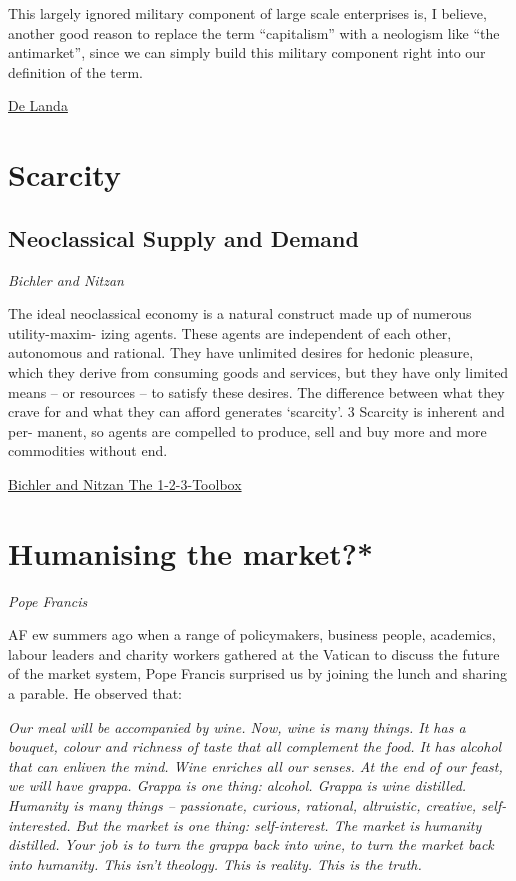 \documentclass[
]{book}
\begin{document}
This largely ignored military component of large scale enterprises is, I believe, another good reason to replace the term ``capitalism'' with a neologism like ``the antimarket'', since we can simply build this military component right into our definition of the term.

\href{https://wiki.p2pfoundation.net/Capitalism_as_an_Anti-Market}{De Landa}

\hypertarget{scarcity}{%
\section{Scarcity}\label{scarcity}}

\hypertarget{neoclassical-supply-and-demand}{%
\subsection{Neoclassical Supply and Demand}\label{neoclassical-supply-and-demand}}

\emph{Bichler and Nitzan}

The ideal neoclassical economy is a natural construct made up of numerous utility-maxim-
izing agents. These agents are independent of each other, autonomous and rational. They have
unlimited desires for hedonic pleasure, which they derive from consuming goods and services,
but they have only limited means -- or resources -- to satisfy these desires. The difference between
what they crave for and what they can afford generates `scarcity'. 3 Scarcity is inherent and per-
manent, so agents are compelled to produce, sell and buy more and more commodities without
end.

\href{Bichler_Nitzan_The_1_2_3_Toolbox.pdf}{Bichler and Nitzan The 1-2-3-Toolbox}

\hypertarget{humanising-the-market}{%
\section{Humanising the market?*}\label{humanising-the-market}}

\emph{Pope Francis}

AF ew summers ago when a range of policymakers, business people, academics, labour leaders and charity workers gathered at the Vatican to discuss the future of the market system, Pope Francis surprised us by joining the lunch and sharing a parable. He observed that:

\emph{Our meal will be accompanied by wine. Now, wine is many things. It has a bouquet, colour and richness of taste that all complement the food. It has alcohol that can enliven the mind. Wine enriches all our senses.
At the end of our feast, we will have grappa. Grappa is one thing: alcohol. Grappa is wine distilled.
Humanity is many things -- passionate, curious, rational, altruistic, creative, self-interested. But the market is one thing: self-interest. The market is humanity distilled.
Your job is to turn the grappa back into wine, to turn the market back into humanity. This isn't theology. This is reality. This is the truth.}
\end{document}

